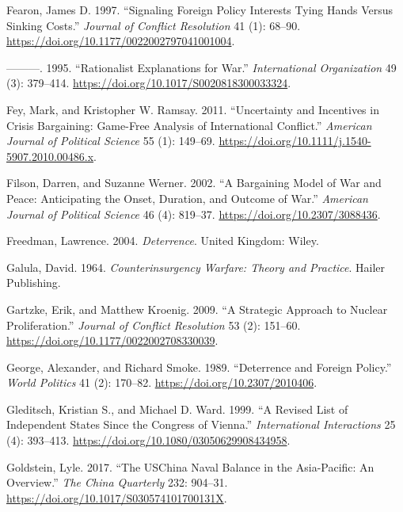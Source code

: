 \documentclass[
]{article}
\begin{document}
\leavevmode\hypertarget{ref-fearon_signalingforeignpolicy_1997}{}%
Fearon, James D. 1997. ``Signaling Foreign Policy Interests Tying Hands Versus Sinking Costs.'' \emph{Journal of Conflict Resolution} 41 (1): 68--90. \url{https://doi.org/10.1177/0022002797041001004}.

\leavevmode\hypertarget{ref-fearon_rationalistexplanationswar_1995}{}%
---------. 1995. ``Rationalist Explanations for War.'' \emph{International Organization} 49 (3): 379--414. \url{https://doi.org/10.1017/S0020818300033324}.

\leavevmode\hypertarget{ref-fey_uncertaintyincentivescrisis_2011}{}%
Fey, Mark, and Kristopher W. Ramsay. 2011. ``Uncertainty and Incentives in Crisis Bargaining: Game-Free Analysis of International Conflict.'' \emph{American Journal of Political Science} 55 (1): 149--69. \url{https://doi.org/10.1111/j.1540-5907.2010.00486.x}.

\leavevmode\hypertarget{ref-filson_bargainingmodelwar_2002}{}%
Filson, Darren, and Suzanne Werner. 2002. ``A Bargaining Model of War and Peace: Anticipating the Onset, Duration, and Outcome of War.'' \emph{American Journal of Political Science} 46 (4): 819--37. \url{https://doi.org/10.2307/3088436}.

\leavevmode\hypertarget{ref-freedman_deterrence_2004}{}%
Freedman, Lawrence. 2004. \emph{Deterrence}. United Kingdom: Wiley.

\leavevmode\hypertarget{ref-galula_counterinsurgencywarfaretheory_1964}{}%
Galula, David. 1964. \emph{Counterinsurgency Warfare: Theory and Practice}. Hailer Publishing.

\leavevmode\hypertarget{ref-gartzke_strategicapproachnuclear_2009}{}%
Gartzke, Erik, and Matthew Kroenig. 2009. ``A Strategic Approach to Nuclear Proliferation.'' \emph{Journal of Conflict Resolution} 53 (2): 151--60. \url{https://doi.org/10.1177/0022002708330039}.

\leavevmode\hypertarget{ref-george_deterrenceforeignpolicy_1989}{}%
George, Alexander, and Richard Smoke. 1989. ``Deterrence and Foreign Policy.'' \emph{World Politics} 41 (2): 170--82. \url{https://doi.org/10.2307/2010406}.

\leavevmode\hypertarget{ref-gleditsch_revisedlistindependent_1999}{}%
Gleditsch, Kristian S., and Michael D. Ward. 1999. ``A Revised List of Independent States Since the Congress of Vienna.'' \emph{International Interactions} 25 (4): 393--413. \url{https://doi.org/10.1080/03050629908434958}.

\leavevmode\hypertarget{ref-goldstein_uschinanaval_2017}{}%
Goldstein, Lyle. 2017. ``The USChina Naval Balance in the Asia-Pacific: An Overview.'' \emph{The China Quarterly} 232: 904--31. \url{https://doi.org/10.1017/S030574101700131X}.
\end{document}

